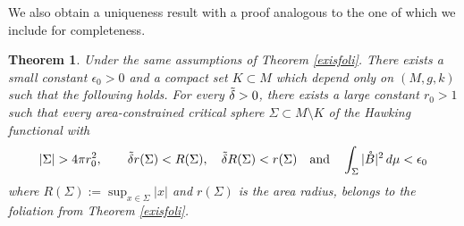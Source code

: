 \documentclass[12pt,a4paper]{amsart}
\theoremstyle{plain}
\newtheorem{theorem}{Theorem}[section]
\theoremstyle{definition}
\begin{document}
We also obtain a uniqueness result with a proof analogous to the one of \cite[Theorem 8]{eichko} which we include for completeness.
\begin{theorem}\label{uniqueness}
    Under the same assumptions of Theorem \ref{exisfoli}. There exists a small constant \(\epsilon_0 > 0\) and a compact set
\(K \subset M\) which depend only on \((M, g, k)\) such that the following holds. For every \(\Tilde{\delta} > 0\), there exists a
large constant \(r_0 > 1\) such that every area-constrained critical sphere \(\Sigma \subset M \setminus K\) of the Hawking functional with
\[
|\Sigma| > 4 \pi r_0^2, \quad \quad \Tilde{\delta} r(\Sigma) < R(\Sigma), \quad \Tilde{\delta} R(\Sigma) < r(\Sigma)  \quad \text{and}\quad \int_{\Sigma} |\mathring{B}|^2 \, d\mu < \epsilon_0 
\]
 where $R(\Sigma):=\sup_{x \in \Sigma } |x|$ and $r(\Sigma)$ is the area radius, belongs to the foliation from Theorem \ref{exisfoli}.
\end{theorem}
\end{document}
